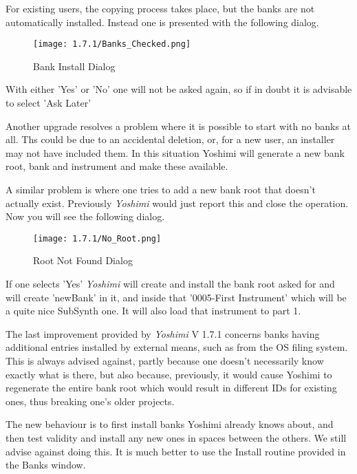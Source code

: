    For existing users, the copying process takes place, but the banks are not
   automatically installed. Instead one is presented with the following dialog.

\begin{figure}[H]
   \centering
   \texttt{[image: 1.7.1/Banks\_Checked.png]}
   \caption{Bank Install Dialog}
   \label{fig:bank_install_dialog}
\end{figure}

   With either 'Yes' or 'No' one will not be asked again, so if in doubt it is
   advisable to select 'Ask Later'

   Another upgrade resolves a problem where it is possible to start with no banks
   at all. Ths could be due to an accidental deletion, or, for a new user, an
   installer may not have included them. In this situation Yoshimi will generate
   a new bank root, bank and instrument and make these available.

   A similar problem is where one tries to add a new bank root that doesn't
   actually exist. Previously \textsl{Yoshimi} would just report this and close
   the operation. Now you will see the following dialog.

\begin{figure}[H]
   \centering
   \texttt{[image: 1.7.1/No\_Root.png]}
   \caption{Root Not Found Dialog}
   \label{fig:no_root_dialog}
\end{figure}

If one selects 'Yes' \textsl{Yoshimi} will create and install the bank root asked for and will create 'newBank' in it, and inside that '0005-First Instrument' which will be a quite nice SubSynth one. It will also load that instrument to part 1.

The last improvement provided by \textsl{Yoshimi} V 1.7.1 concerns banks having additional entries installed by external means, such as from the OS filing system. This is always advised against, partly because one doesn't necessarily know exactly what is there, but also because, previously, it would cause Yoshimi to regenerate the entire bank root which would result in different IDs for existing ones, thus breaking one's older projects.

The new behaviour is to first install banks Yoshimi already knows about, and then test validity and install any new ones in spaces between the others. We still advise against doing this. It is much better to use the Install routine provided in the Banks window.

